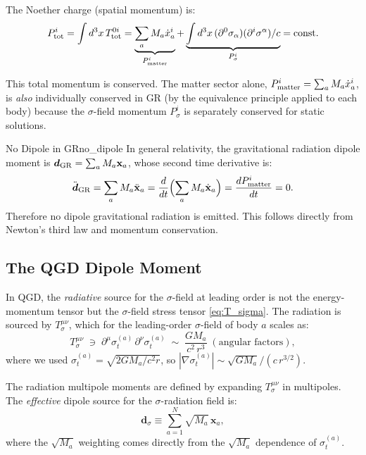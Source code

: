 \documentclass[11pt,a4paper]{article}
\theoremstyle{definition}
\theoremstyle{remark}
\newcommand{\sig}[2]{\sigma_{#1}^{(#2)}}
\newcommand{\boldx}{\mathbf{x}}
\begin{document}
	The Noether charge (spatial momentum) is:
	\begin{equation}
		P^i_{\rm tot}
		= \int d^3x\,T^{0i}_{\rm tot}
		= \underbrace{\sum_a M_a\dot{x}_a^i}_{P^i_{\rm matter}}
		+ \underbrace{\int d^3x\,(\partial^0\sigma_\alpha)(\partial^i\sigma^\alpha)/c}_{P^i_\sigma}
		= \text{const}.
		\label{eq:P_total_conserved}
	\end{equation}
	
	This total momentum is conserved.  The matter sector alone,
	$P^i_{\rm matter}=\sum_a M_a\dot{x}_a^i$, is \emph{also} individually
	conserved in GR (by the equivalence principle applied to each body)
	because the $\sigma$-field momentum $P^i_\sigma$ is separately
	conserved for static solutions.
	
	\begin{proposition}{No Dipole in GR}{no_dipole}
		In general relativity, the gravitational radiation dipole moment is
		$\boldsymbol{d}_{\rm GR}=\sum_a M_a\boldx_a$, whose second time
		derivative is:
		\begin{equation}
			\ddot{\boldsymbol{d}}_{\rm GR}
			= \sum_a M_a\ddot{\boldx}_a
			= \frac{d}{dt}\Bigl(\sum_a M_a\dot{\boldx}_a\Bigr)
			= \frac{dP^i_{\rm matter}}{dt}
			= 0.
			\label{eq:gr_no_dipole}
		\end{equation}
		Therefore no dipole gravitational radiation is emitted.
		This follows directly from Newton's third law and momentum conservation.
	\end{proposition}
	
	\subsection{The QGD Dipole Moment}
	
	In QGD, the \emph{radiative} source for the $\sigma$-field at
	leading order is not the energy-momentum tensor but the
	$\sigma$-field stress tensor \eqref{eq:T_sigma}.  The radiation
	is sourced by $T^{\mu\nu}_\sigma$, which for the leading-order
	$\sigma$-field of body $a$ scales as:
	\begin{equation}
		T^{\mu\nu}_\sigma
		\;\ni\;
		\partial^\mu\sig{t}{a}\,\partial^\nu\sig{t}{a}
		\;\sim\;
		\frac{G M_a}{c^2\,r^3}\;(\text{angular factors}),
		\label{eq:T_sigma_scaling}
	\end{equation}
	where we used $\sig{t}{a}=\sqrt{2GM_a/c^2 r}$, so
	$|\nabla\sig{t}{a}|\sim\sqrt{GM_a}/(c\,r^{3/2})$.
	
	The radiation multipole moments are defined by expanding
	$T^{\mu\nu}_\sigma$ in multipoles.  The \emph{effective} dipole source
	for the $\sigma$-radiation field is:
	\begin{equation}
		\boxed{
			\boldsymbol{d}_\sigma
			\equiv
			\sum_{a=1}^N \sqrt{M_a}\,\boldx_a,
		}
		\label{eq:qgd_dipole}
	\end{equation}
	where the $\sqrt{M_a}$ weighting comes directly from the $\sqrt{M_a}$
	dependence of $\sig{t}{a}$.
	
\end{document}
